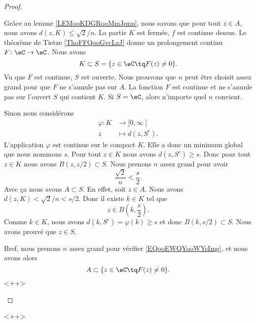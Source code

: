 \begin{proof}
\begin{subproof}
        Grâce au lemme \ref{LEMooKDGRooMmJqnn}, nous savons que pour tout \( z\in A\), nous avons \( d(z,K)\leq \sqrt{ 2 }/n\).
        \spitem[Prolongement]
        La partie \( K\) est fermée, \( f\) est continue dessus. Le théorème de Tietze \ref{ThoFFQooGvcLzJ} donne un prolongement continu \( F\colon \eC\to \eC\). Nous avons
        \begin{equation}
            K\subset S=\{ z\in \eC\tq F(z)\neq 0 \}.
        \end{equation}
        Vu que \( F\) est continue, \( S\) est ouverte.
        \spitem[Grand \( n\)]
        Nous prouvons que \( n\) peut être choisit assez grand pour que \( F\) ne s'annule pas sur \( A\). La fonction \( F\) est continue et ne s'annule pas sur l'ouvert \( S\) qui contient \( K\). Si \( S=\eC\), alors n'importe quel \( n\) convient.

         Sinon nous considérons
        \begin{equation}
            \begin{aligned}
                \varphi\colon K&\to \mathopen[ 0 , \infty \mathclose[ \\
                        z&\mapsto d(z,S^c). 
            \end{aligned}
        \end{equation}
        L'application \( \varphi\) est continue sur le compact \( K\). Elle a donc un minimum global que nous nommons \( s\). Pour tout \( z\in K\) nous avons \( d(z,S^c)\geq s\). Donc pour tout \( z\in K\) nous avons \( B(z,z/2)\subset S\). Nous prenons \( n\) assez grand pour avoir
        \begin{equation}        \label{EQooEWQYooWYsImg}
            \frac{ \sqrt{ 2 } }{ n }<\frac{ s }{ 2 }.
        \end{equation}
        Avec ça nous avons \( A\subset S\). En effet, soit \( z\in A\). Nous avons \( d(z,K)<\sqrt{ 2 }/n<s/2\). Donc il existe \( k\in K\) tel que 
        \begin{equation}
            z\in B(k,\frac{ s }{2}).
        \end{equation}
        Comme \( k\in K\), nous avons \( d(k,S^c)=\varphi(k)\geq s\) et donc \( B(k,s/2)\subset S\). Nous avons prouvé que \( z\in S\).

        Bref, nous prenons \( n\) assez grand pour vérifier \eqref{EQooEWQYooWYsImg}, et nous avons alors 
        \begin{equation}
            A\subset \{ z\in \eC\tq F(z)\neq 0 \}.
        \end{equation}
        <++>
        
    \end{subproof}
    
\end{proof}
<++>

